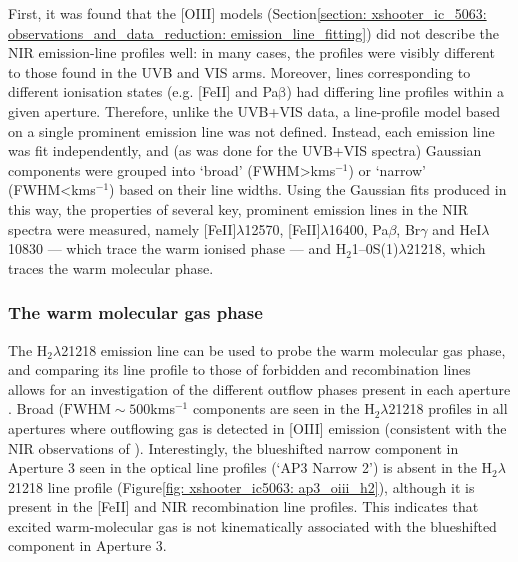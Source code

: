 First, it was found that the [OIII] models (Section\;\ref{section: xshooter_ic_5063: observations_and_data_reduction: emission_line_fitting}) did not describe the NIR emission-line profiles well: in many cases, the profiles were visibly different to those found in the UVB and VIS arms. Moreover, lines corresponding to different ionisation states (e.g. [FeII] and Pa$\mathrm{\beta}$) had differing line profiles within a given aperture. Therefore, unlike the UVB+VIS data, a line-profile model based on a single prominent emission line was not defined. Instead, each emission line was fit independently, and (as was done for the UVB+VIS spectra) Gaussian components were grouped into `broad' (\mbox{FWHM\;\textgreater{}\;km\;s$^{-1}$}) or `narrow' (\mbox{FWHM\;\textless{}\;km\;s$^{-1}$}) based on their line widths. Using the Gaussian fits produced in this way, the properties of several key, prominent emission lines in the NIR spectra were measured, namely [FeII]$\lambda$12570, [FeII]$\lambda$16400, Pa$\beta$, Br$\gamma$ and HeI$\lambda$10830 --- which trace the warm ionised phase --- and H$_2$1--0S(1)$\lambda$21218, which traces the warm molecular phase.

\subsubsection{The warm molecular gas phase}
\label{section: xshooter_ic5063: properties_of_outflowing_gas: nir_analysis_and_results: warm_molecular}

The H$_2 \lambda$21218 emission line can be used to probe the warm molecular gas phase, and comparing its line profile to those of forbidden and recombination lines allows for an investigation of the different outflow phases present in each aperture \citep{Tadhunter2014}. Broad ($\mathrm{FWHM}\sim500$\;km\;s$^{-1}$ components are seen in the H$_2 \lambda$21218 profiles in all apertures where outflowing gas is detected in [OIII] emission (consistent with the NIR observations of \citet{Tadhunter2014}). Interestingly, the blueshifted narrow component in Aperture 3 seen in the optical line profiles (`AP3 Narrow 2') is absent in the H$_2 \lambda$21218 line profile (Figure\;\ref{fig: xshooter_ic5063: ap3_oiii_h2}), although it is present in the [FeII] and NIR recombination line profiles. This indicates that excited warm-molecular gas is not kinematically associated with the blueshifted component in Aperture 3.

